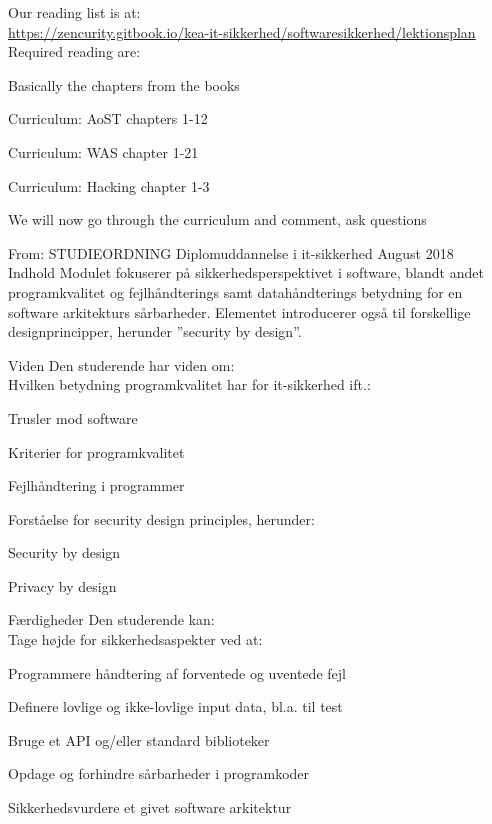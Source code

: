 \documentclass[Screen16to9,17pt]{foils}
\begin{document}
Our reading list is at:\\
{\small\url{https://zencurity.gitbook.io/kea-it-sikkerhed/softwaresikkerhed/lektionsplan}}
Required reading are:
\begin{list2}
    \item Basically the chapters from the books
\item Curriculum: AoST chapters 1-12
\item Curriculum: WAS chapter 1-21
\item Curriculum: Hacking chapter 1-3
\item We will now go through the curriculum and comment, ask questions
\end{list2}



From: STUDIEORDNING Diplomuddannelse i it-sikkerhed August 2018\\
Indhold
Modulet fokuserer på sikkerhedsperspektivet i software, blandt andet
programkvalitet og fejlhåndterings samt datahåndterings betydning for en
software arkitekturs sårbarheder.
Elementet introducerer også til forskellige designprincipper, herunder ”security by design”.

Viden  Den studerende har viden om:\\
Hvilken betydning programkvalitet har for it-sikkerhed ift.:
\begin{list2}
\item Trusler mod software
\item Kriterier for programkvalitet
\item Fejlhåndtering i programmer
\item Forståelse for security design principles, herunder:
\item Security by design
\item Privacy by design
\end{list2}

Færdigheder Den studerende kan:\\
Tage højde for sikkerhedsaspekter ved at:
\begin{list2}
\item Programmere håndtering af forventede og uventede fejl
\item Definere lovlige og ikke-lovlige input data, bl.a. til test
\item Bruge et API og/eller standard biblioteker
\item Opdage og forhindre sårbarheder i programkoder
\item Sikkerhedsvurdere et givet software arkitektur
\end{list2}
\end{document}
